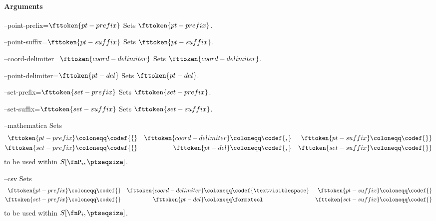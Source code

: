 \paragraph{Arguments}

\procarginseq{\ptseqsize}

\procargout

\begin{procarg}{--point-prefix=$\fttoken{pt-prefix}$}
  Sets $\fttoken{pt-prefix}$.
\end{procarg}

\begin{procarg}{--point-suffix=$\fttoken{pt-suffix}$}
  Sets $\fttoken{pt-suffix}$.
\end{procarg}

\begin{procarg}{--coord-delimiter=$\fttoken{coord-delimiter}$}
  Sets $\fttoken{coord-delimiter}$.
\end{procarg}

\begin{procarg}{--point-delimiter=$\fttoken{pt-del}$}
  Sets $\fttoken{pt-del}$.
\end{procarg}

\begin{procarg}{--set-prefix=$\fttoken{set-prefix}$}
  Sets $\fttoken{set-prefix}$.
\end{procarg}

\begin{procarg}{--set-suffix=$\fttoken{set-suffix}$}
  Sets $\fttoken{set-suffix}$.
\end{procarg}

\begin{procarg}{--mathematica}
  Sets 
  \begin{align*}
    \fttoken{pt-prefix} &\coloneqq \codef{\{} &
    \fttoken{coord-delimiter} &\coloneqq \codef{,} &
    \fttoken{pt-suffix} &\coloneqq \codef{\}} \\
    \fttoken{set-prefix} &\coloneqq \codef{\{} &
    \fttoken{pt-del} &\coloneqq \codef{,} &
    \fttoken{set-suffix} &\coloneqq \codef{\}}
  \end{align*}
  to be used within $S[\fnP_i, \ptseqsize]$.
\end{procarg}

\begin{procarg}{--csv}
  Sets 
  \begin{align*}
    \fttoken{pt-prefix} &\coloneqq \codef{} &
    \fttoken{coord-delimiter} &\coloneqq \codef{\textvisiblespace } &
    \fttoken{pt-suffix} &\coloneqq \codef{} \\
    \fttoken{set-prefix} &\coloneqq \codef{} &
    \fttoken{pt-del} &\coloneqq \formateol &
    \fttoken{set-suffix} &\coloneqq \codef{}
  \end{align*}
  to be used within $S[\fnP_i, \ptseqsize]$.
\end{procarg}

\procargsilent
